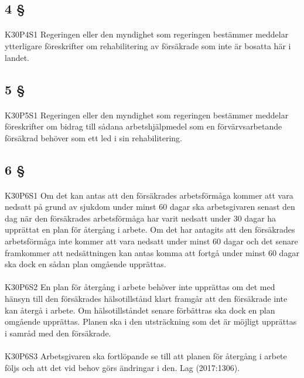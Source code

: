 \documentclass[a4paper,notitlepage,openany,10pt]{book}
\begin{document}
\subsection*{4 §}
\paragraph*{}
{\tiny K30P4S1}
Regeringen eller den myndighet som regeringen bestämmer meddelar ytterligare föreskrifter om rehabilitering av försäkrade som inte är bosatta här i landet.
\subsection*{5 §}
\paragraph*{}
{\tiny K30P5S1}
Regeringen eller den myndighet som regeringen bestämmer meddelar föreskrifter om bidrag till sådana arbetshjälpmedel som en förvärvsarbetande försäkrad behöver som ett led i sin rehabilitering.
\subsection*{6 §}
\paragraph*{}
{\tiny K30P6S1}
Om det kan antas att den försäkrades arbetsförmåga kommer att vara nedsatt på grund av sjukdom under minst 60 dagar ska arbetsgivaren senast den dag när den försäkrades arbetsförmåga har varit nedsatt under 30 dagar ha upprättat en plan för återgång i arbete. Om det har antagits att den försäkrades arbetsförmåga inte kommer att vara nedsatt under minst 60 dagar och det senare framkommer att nedsättningen kan antas komma att fortgå under minst 60 dagar ska dock en sådan plan omgående upprättas.
\paragraph*{}
{\tiny K30P6S2}
En plan för återgång i arbete behöver inte upprättas om det med hänsyn till den försäkrades hälsotillstånd klart framgår att den försäkrade inte kan återgå i arbete. Om hälsotillståndet senare förbättras ska dock en plan omgående upprättas. Planen ska i den utsträckning som det är möjligt upprättas i samråd med den försäkrade.
\paragraph*{}
{\tiny K30P6S3}
Arbetsgivaren ska fortlöpande se till att planen för återgång i arbete följs och att det vid behov görs ändringar i den.
Lag (2017:1306).
\end{document}
